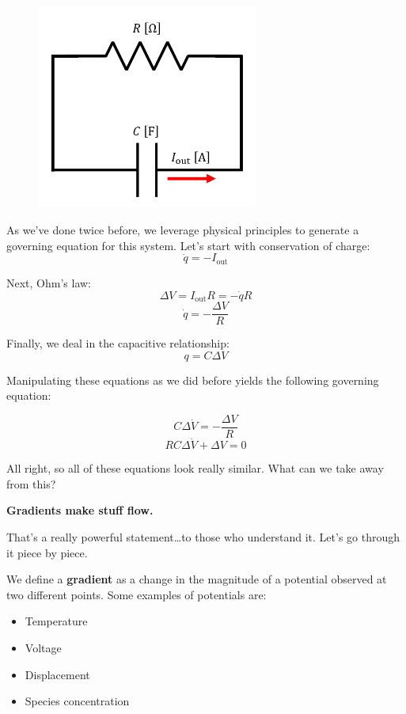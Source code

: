 \documentclass[
  letterpaper,
  DIV=11,
  numbers=noendperiod]{scrreprt}
\providecommand{\tightlist}{%
  \setlength{\itemsep}{0pt}\setlength{\parskip}{0pt}}\usepackage{longtable,booktabs,array}
\begin{document}
\begin{figure}

{\centering \includegraphics[width=0.65\textwidth,height=\textheight]{figs/2_circ.png}

}

\end{figure}

As we've done twice before, we leverage physical principles to generate
a governing equation for this system. Let's start with conservation of
charge: \[\dot{q} = -I_\text{out}\]

Next, Ohm's law: \[\Delta V = I_\text{out} R = -\dot{q} R\]
\[\dot{q} = -\frac{\Delta V}{R}\]

Finally, we deal in the capacitive relationship: \[q = C\Delta V\]

Manipulating these equations as we did before yields the following
governing equation:

\[C \Delta \dot{V} = -\frac{\Delta V}{R}\]
\[\boxed{RC \Delta \dot{V} + \Delta V = 0}\]

All right, so all of these equations look really similar. What can we
take away from this?

\textbf{Gradients make stuff flow.}

That's a really powerful statement\ldots to those who understand it.
Let's go through it piece by piece.

We define a \textbf{gradient} as a change in the magnitude of a
potential observed at two different points. Some examples of potentials
are:

\begin{itemize}
\tightlist
\item
  Temperature
\item
  Voltage
\item
  Displacement
\item
  Species concentration
\end{itemize}
\end{document}
